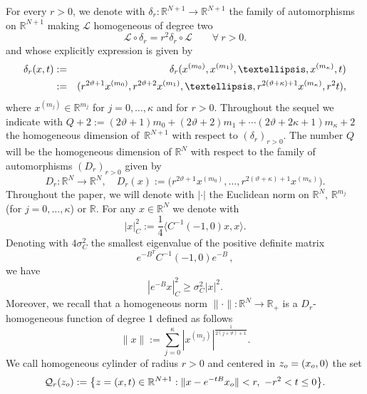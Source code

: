 \documentclass{amsart}
\numberwithin{equation}{section}
\def \Lc{{\mathcal{L}}}
\def \r{{\mathbb{R}}}
\begin{document}
{For every $r>0$, we denote with $\delta_r: \r^{N+1} \to \r^{N+1}$ the {%
family of automorphisms  on $\r^{N+1}$ making $\Lc$ homogeneous of degree two 
\begin{equation} \label{dilation_invariance}
\Lc \circ \delta_r = r^2 \delta_r\circ \Lc \qquad \forall \  r>0.
\end{equation}
and whose explicitly expression is} given by
\begin{eqnarray} \label{dilations}
 \delta_r(x,t) & := & \delta_r(x^{(m_0)},x^{(m_1)},\dots,x^{(m_\kappa)},t)\notag\\
 & := &    (r^{2\vartheta +1}x^{(m_0)},r^{2\vartheta+2}x^{(m_1)},\dots,r^{2(\vartheta+\kappa)+1}x^{(m_\kappa)},r^2 t),
\end{eqnarray}
where
{%
$x^{(m_j)} \in \r^{m_j}$ for $j=0,\dots,\kappa$ and for $r>0$.} Throughout the sequel we indicate with $Q+2:=(2\vartheta+1) m_0 + (2\vartheta+2)m_1+\cdots (2\vartheta+2\kappa+1)m_\kappa +2$ the homogeneous dimension of~$\r^{N+1}$ with respect to $(\delta_r)_{r>0}$. The number $Q$ will be the {homogeneous dimension} of $\r^N$ with respect to the family of automorphisms $(D_r)_{r>0}$ given by
\begin{equation}\label{spatial dilation}
D_r : \r^N \to \r^N, \quad	D_r(x):=  \big(r^{2\vartheta +1}x^{(m_0)},\dots,r^{2(\vartheta+\kappa)+1}x^{(m_\kappa)}\big).
\end{equation}
{Throughout the paper, we will denote with $|\cdot|$ the Euclidean norm on $\r^N$, $\r^{m_j}$ (for $j=0,\dots,\kappa$) or $\r$. For any $x \in \r^N$ we denote with
\begin{equation}\label{def:normC}
|x|_{C}^2 := \frac{1}{4}\langle C^{-1}(-1,0) x,x\rangle.
\end{equation}
Denoting with $4\sigma_C^2$ the smallest eigenvalue of the positive definite matrix
\[
e^{-B^T}C^{-1}(-1,0)e^{-B}\,,
\]
we have 
\begin{equation}\label{eq:propC}
    |e^{-B}x|_{C}^2 \geq \sigma_C^2|x|^2.
\end{equation}
Moreover, we recall that a homogeneous norm $\|\cdot\|: \r^{N}\to \r_+$ is a $D_r$-homogeneous function of degree $1$ defined as follows
\[
\|x\|:= \sum_{j=0}^{\kappa}\left|x^{(m_j)}\right|^\frac{1}{2(j + \vartheta)+1}.
\]
We call homogeneous cylinder of radius $r>0$ and centered in $z_{\rm o}=(x_{\rm o},0)$ the set
\begin{equation}\label{eq:cylinder-homogeneous}
\mathcal{Q}_r(z_{\rm o}) := \big\{z=(x,t) \in \r^{N+1}: \|x-e^{-tB}x_{\rm o}\| < r, \ -r^{2} < t \leq 0 \big\}.

\end{equation}}}
\end{document}
